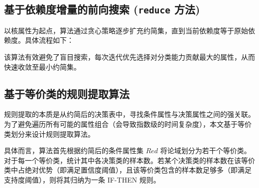 \subsection{基于依赖度增量的前向搜索 (\texttt{reduce} 方法)}

以核属性为起点，算法通过贪心策略逐步扩充约简集，直到当前依赖度等于原始依赖度。具体流程如下：


该算法有效避免了盲目搜索，每次迭代优先选择对分类能力贡献最大的属性，从而快速收敛至最小约简集。

\subsection{基于等价类的规则提取算法}

规则提取的本质是从约简后的决策表中，寻找条件属性与决策属性之间的强关联。为了避免遍历所有可能的属性组合（会导致指数级的时间复杂度），本文基于等价类划分来设计规则提取算法。

具体而言，算法首先根据约简后的条件属性集 \(Red\) 将论域划分为若干个等价类。对于每一个等价类，统计其中各决策类的样本数。若某个决策类的样本数在该等价类中占绝对优势（即满足置信度阈值），且该等价类包含的样本数足够多（即满足支持度阈值），则将其归纳为一条 IF-THEN 规则。

